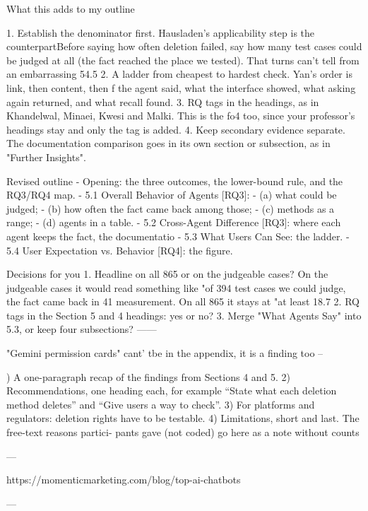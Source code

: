 What this adds to my outline

1. Establish the denominator first. Hausladen's applicability step is the counterpartBefore saying how often deletion failed, say how many test cases could be judged at all (the fact reached the place we tested). That turns can't tell from an embarrassing 54.5%
2. A ladder from cheapest to hardest check. Yan's order is link, then content, then f the agent said, what the interface showed, what asking again returned, and what recall found.
3. RQ tags in the headings, as in Khandelwal, Minaei, Kwesi and Malki. This is the fo4 too, since your professor's headings stay and only the tag is added.
4. Keep secondary evidence separate. The documentation comparison goes in its own section or subsection, as in "Further Insights".

Revised outline
- Opening: the three outcomes, the lower-bound rule, and the RQ3/RQ4 map.
- 5.1 Overall Behavior of Agents [RQ3]:
  - (a) what could be judged;
  - (b) how often the fact came back among those;
  - (c) methods as a range;
  - (d) agents in a table.
- 5.2 Cross-Agent Difference [RQ3]: where each agent keeps the fact, the documentatio
- 5.3 What Users Can See: the ladder.
- 5.4 User Expectation vs. Behavior [RQ4]: the figure.

Decisions for you
1. Headline on all 865 or on the judgeable cases? On the judgeable cases it would read something like "of 394 test cases we could judge, the fact came back in 41%
   measurement. On all 865 it stays at "at least 18.7%
2. RQ tags in the Section 5 and 4 headings: yes or no?
3. Merge "What Agents Say" into 5.3, or keep four subsections?
------

"Gemini permission cards" cant' tbe in the appendix, it is a finding too
--

) A one-paragraph recap of the findings from Sections 4
and 5.
2) Recommendations, one heading each, for example “State
what each deletion method deletes” and “Give users a
way to check”.
3) For platforms and regulators: deletion rights have to be
testable.
4) Limitations, short and last. The free-text reasons partici-
pants gave (not coded) go here as a note without counts

---

https://momenticmarketing.com/blog/top-ai-chatbots


---


